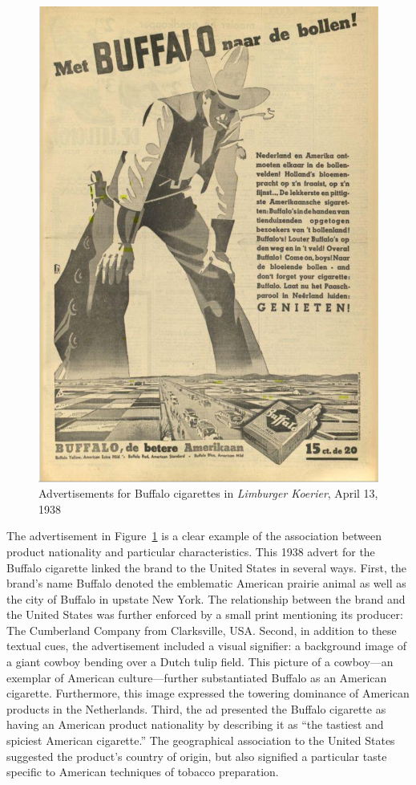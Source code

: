 \documentclass[USenglish]{article}
\begin{document}
\begin{figure}
  \centering
  \includegraphics[width=.9\textwidth]{figures/example_buffalo.jpg}
  \caption{Advertisements for Buffalo cigarettes in \textit{Limburger Koerier}, April 13, 1938}
  \label{fig:buffalo_example}
\end{figure}

The advertisement in Figure~\ref{fig:buffalo_example} is a clear example of the association between product nationality and particular characteristics. This  1938 advert for the Buffalo cigarette linked the brand to the United States in several ways. First, the brand's name Buffalo denoted the emblematic American prairie animal as well as the city of Buffalo in upstate New York. The relationship between the brand and the United States was further enforced by a small print mentioning its producer: The Cumberland Company from Clarksville, USA.
%
Second, in addition to these textual cues, the advertisement included a visual signifier: a background image of a giant cowboy bending over a Dutch tulip field. This picture of a cowboy—an exemplar of American culture—further substantiated Buffalo as an American cigarette. Furthermore, this image expressed the towering dominance of American products in the Netherlands.
%
Third, the ad presented the Buffalo cigarette as having an American product nationality by describing it as ``the tastiest and spiciest American cigarette.'' The geographical association to the United States suggested the product’s country of origin, but also signified a particular taste specific to American techniques of tobacco preparation.
\end{document}
